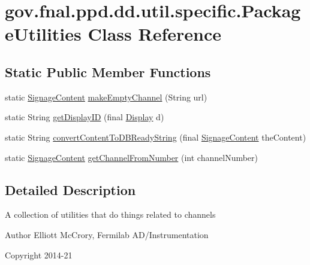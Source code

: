 \hypertarget{classgov_1_1fnal_1_1ppd_1_1dd_1_1util_1_1specific_1_1PackageUtilities}{\section{gov.\-fnal.\-ppd.\-dd.\-util.\-specific.\-Package\-Utilities Class Reference}
\label{classgov_1_1fnal_1_1ppd_1_1dd_1_1util_1_1specific_1_1PackageUtilities}
}
\subsection*{Static Public Member Functions}
\begin{DoxyCompactItemize}
\item 
static \hyperlink{interfacegov_1_1fnal_1_1ppd_1_1dd_1_1signage_1_1SignageContent}{Signage\-Content} \hyperlink{classgov_1_1fnal_1_1ppd_1_1dd_1_1util_1_1specific_1_1PackageUtilities_a21b0b417b695336725658a6fde76b042}{make\-Empty\-Channel} (String url)
\item 
static String \hyperlink{classgov_1_1fnal_1_1ppd_1_1dd_1_1util_1_1specific_1_1PackageUtilities_ac76f976bf20f252c63f3fe1a5e934d55}{get\-Display\-I\-D} (final \hyperlink{interfacegov_1_1fnal_1_1ppd_1_1dd_1_1signage_1_1Display}{Display} d)
\item 
static String \hyperlink{classgov_1_1fnal_1_1ppd_1_1dd_1_1util_1_1specific_1_1PackageUtilities_a77b0bd55fcfdef42895b14ee8fd86e1b}{convert\-Content\-To\-D\-B\-Ready\-String} (final \hyperlink{interfacegov_1_1fnal_1_1ppd_1_1dd_1_1signage_1_1SignageContent}{Signage\-Content} the\-Content)
\item 
static \hyperlink{interfacegov_1_1fnal_1_1ppd_1_1dd_1_1signage_1_1SignageContent}{Signage\-Content} \hyperlink{classgov_1_1fnal_1_1ppd_1_1dd_1_1util_1_1specific_1_1PackageUtilities_aed411058ce30f98adc137f40cfa053f8}{get\-Channel\-From\-Number} (int channel\-Number)
\end{DoxyCompactItemize}


\subsection{Detailed Description}
A collection of utilities that do things related to channels 

\begin{DoxyAuthor}{Author}
Elliott Mc\-Crory, Fermilab A\-D/\-Instrumentation 
\end{DoxyAuthor}
\begin{DoxyCopyright}{Copyright}
2014-\/21 
\end{DoxyCopyright}


